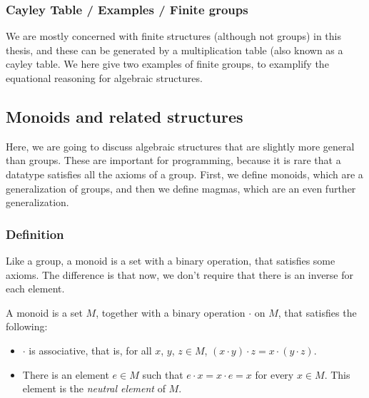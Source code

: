 \subsubsection{Cayley Table / Examples / Finite groups}
We are mostly concerned with finite structures (although not groups) in this thesis, and these can be generated by a multiplication table (also known as a cayley table. We here give two examples of finite groups, to examplify the equational reasoning for algebraic structures.







\subsection{Monoids and related structures} %
Here, we are going to discuss algebraic structures that are slightly more general than groups. These are important for programming, because it is rare that a datatype satisfies all the axioms of a group. First, we define monoids, which are a generalization of groups, and then we define magmas, which are an even further generalization.
\subsubsection{Definition}
Like a group, a monoid is a set with a binary operation, that satisfies some axioms. The difference is that now, we don't require that there is an inverse for each element.
\begin{Definition}
  A monoid is a set $M$, together with a binary operation $\cdot$ on $M$, that satisfies the following:
  \begin{itemize}
  \item $\cdot$ is associative, that is, for all $x$, $y$, $z \in M$, $(x \cdot y) \cdot z = x \cdot (y \cdot z)$. 
  \item There is an element $e \in M$ such that $e \cdot x = x \cdot e = x$ for every $x \in M$. This element is the \emph{neutral element} of $M$.
  \end{itemize}
\end{Definition}




